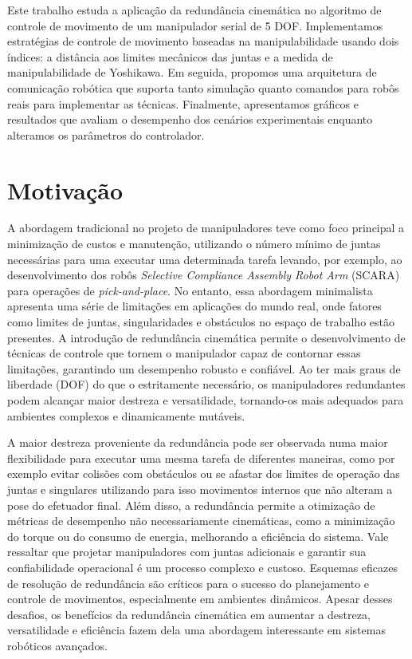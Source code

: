 Este trabalho estuda a aplicação da redundância cinemática no algoritmo de controle de movimento de um manipulador serial de 5 DOF.
Implementamos estratégias de controle de movimento baseadas na manipulabilidade usando dois índices: a distância aos limites mecânicos
das juntas e a medida de manipulabilidade de Yoshikawa. Em seguida, propomos uma arquitetura de comunicação robótica que suporta tanto
simulação quanto comandos para robôs reais para implementar as técnicas. Finalmente, apresentamos gráficos e resultados que avaliam o
desempenho dos cenários experimentais enquanto alteramos os parâmetros do controlador.

\section{Motivação}\label{sec:motivation}


A abordagem tradicional no projeto de manipuladores teve como foco principal a minimização de custos e manutenção,
utilizando o número mínimo de juntas necessárias para uma executar uma determinada tarefa levando, por exemplo, ao 
desenvolvimento dos robôs \emph{Selective Compliance Assembly Robot Arm} (SCARA) para operações de \emph{pick-and-place}.
No entanto, essa abordagem  minimalista apresenta uma série de limitações em aplicações do mundo real, onde fatores como 
limites de juntas, singularidades e obstáculos no espaço de trabalho estão presentes. A introdução de redundância cinemática
permite o desenvolvimento de técnicas de controle que tornem o manipulador capaz de contornar essas limitações, garantindo
um desempenho robusto e confiável. Ao ter mais graus de liberdade (DOF) do que o estritamente necessário, os manipuladores 
redundantes podem alcançar maior destreza e versatilidade, tornando-os mais adequados para ambientes complexos e 
dinamicamente mutáveis.

A maior destreza proveniente da redundância pode ser observada numa maior flexibilidade para executar uma mesma tarefa de 
diferentes maneiras, como por exemplo evitar colisões com obstáculos ou se afastar dos limites de operação das juntas e singulares
utilizando para isso movimentos internos que não alteram a pose do efetuador final. Além disso, a redundância permite a otimização 
de métricas de desempenho não necessariamente cinemáticas, como a minimização do torque ou do consumo de energia, melhorando a eficiência do sistema.
Vale ressaltar que projetar manipuladores com juntas adicionais e garantir sua confiabilidade operacional é um processo complexo e custoso. Esquemas eficazes 
de resolução de redundância são críticos para o sucesso do planejamento e controle de movimentos,  especialmente em ambientes dinâmicos. Apesar desses desafios, 
os benefícios da redundância  cinemática em aumentar a destreza, versatilidade e eficiência fazem dela uma abordagem interessante em sistemas robóticos avançados.

